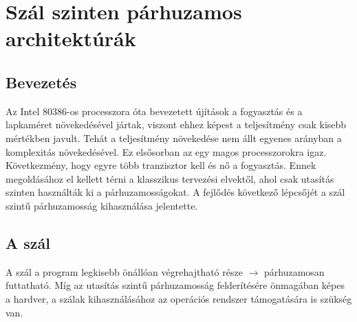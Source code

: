 
\chapter{Szál szinten párhuzamos architektúrák}

\section{Bevezetés}
Az Intel 80386-os processzora óta bevezetett újítások a fogyasztás és a lapkaméret növekedésével jártak, viszont ehhez képest a teljesítmény csak kisebb mértékben javult.
Tehát a teljesítmény növekedése nem állt egyenes arányban a komplexitás növekedésével.
Ez elsősorban az egy magos processzorokra igaz.
Következmény, hogy egyre több tranzisztor kell és nő a fogyasztás.
Ennek megoldásához el kellett térni a klasszikus tervezési elvektől, ahol csak utasítás szinten használták ki a párhuzamosságokat.
A fejlődés következő lépcsőjét a szál szintű párhuzamosság kihasználása jelentette.

\section{A szál}
A szál a program legkisebb önállóan végrehajtható része $\rightarrow$ párhuzamosan futtatható.
Míg az utasítás szintű párhuzamosság felderítésére önmagában képes a hardver, a szálak kihasználásához az operációs rendszer támogatására is szükség van.